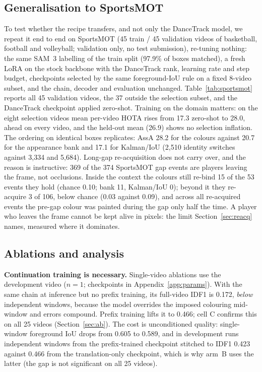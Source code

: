 \documentclass{article} %
\newcommand{\rev}[1]{#1}
\begin{document}
\subsection{Generalisation to SportsMOT}
\label{sec:sportsmot}
To test whether the recipe transfers, and not only the DanceTrack model, we repeat it end to
end on SportsMOT \citep{cui2023sportsmot} (45 train / 45 validation videos of basketball,
football and volleyball; validation only, no test submission), re-tuning nothing: the same
SAM~3 labelling of the train split (97.9\% of boxes matched), a fresh LoRA on the stock
backbone with the DanceTrack rank, learning rate and step budget, checkpoints selected by the
same foreground-IoU rule on a fixed 8-video subset, and the chain, decoder and evaluation
unchanged. Table~\ref{tab:sportsmot} reports all 45 validation videos, the 37 outside the
selection subset, and the DanceTrack checkpoint applied zero-shot. Training on the domain
matters: on the eight selection videos mean per-video HOTA rises from 17.3 zero-shot to
28.0, ahead on every video, and the held-out mean (26.9) shows no selection inflation. The
ordering on identical boxes replicates: AssA 28.2 for the colours against 20.7 for the
appearance bank and 17.1 for Kalman/IoU (2,510 identity switches against 3,334 and 5,684).
Long-gap re-acquisition does not carry over, and the reason is instructive: 369 of the 374
SportsMOT gap events are players leaving the frame, not occlusions. Inside the context the
colours still re-bind 15 of the 53 events they hold (chance 0.10; bank 11, Kalman/IoU 0);
beyond it they re-acquire 3 of 106, below chance (0.03 against 0.09), and across all re-acquired events the
pre-gap colour was painted during the gap only half the time. A player who leaves the frame
cannot be kept alive in pixels: the limit Section~\ref{sec:reacq} names, measured where it
dominates.

\subsection{Ablations and analysis}
\label{sec:ablations}

\textbf{Continuation training is necessary.} Single-video ablations use the development
video ($n{=}1$; checkpoints in Appendix~\ref{app:params}). With the same chain at inference
but no prefix training, its full-video IDF1 is 0.172, \emph{below} independent windows,
because the model overrides the imposed colouring mid-window and errors compound. Prefix
training lifts it to 0.466\rev{; cell C confirms this on all 25 videos (Section~\ref{sec:ab})}.
The cost is unconditioned quality:
single-window foreground IoU drops from 0.605 to 0.589, and \rev{in development runs}
independent windows from the prefix-trained checkpoint stitched to IDF1 0.423 against 0.466
from the translation-only checkpoint, which is why arm~B uses the latter
\rev{(the gap is not significant on all 25 videos)}.
\end{document}
